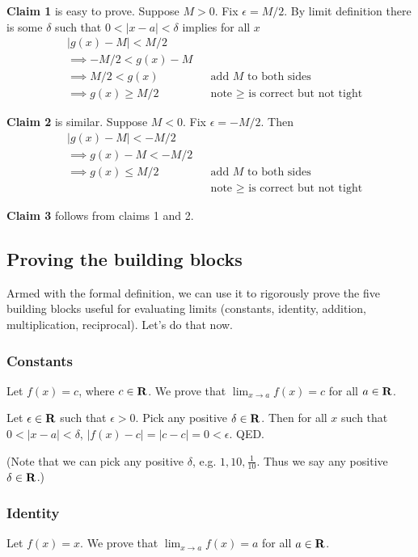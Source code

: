 \textbf{Claim 1} is easy to prove. Suppose $M>0$. Fix $\epsilon=M/2$. By limit definition there is some $\delta$ such that $0<|x-a|<\delta$ implies for all $x$
\begin{align*}
    &|g(x)-M|<M/2\\
    &\implies -M/2<g(x)-M\\
    &\implies M/2<g(x)&&\text{add $M$ to both sides}\\
    &\implies g(x)\geq M/2&&\text{note $\geq$ is correct but not tight}
\end{align*}

\textbf{Claim 2} is similar. Suppose $M<0$. Fix $\epsilon=-M/2$. Then
\begin{align*}
    &|g(x)-M|<-M/2\\
    &\implies g(x)-M<-M/2\\
    &\implies g(x)\leq M/2&&\text{add $M$ to both sides}\\
    & &&\text{note $\geq$ is correct but not tight}
\end{align*}

\textbf{Claim 3} follows from claims 1 and 2.

\subsection{Proving the building blocks}
Armed with the formal definition, we can use it to rigorously prove the five building blocks useful for evaluating limits (constants, identity, addition, multiplication, reciprocal). Let's do that now.

\subsubsection{Constants}
Let $f(x)=c$, where $c\in\mathbf{R}$. We prove that $\lim_{x\to a}f(x)=c$ for all $a\in\mathbf{R}$.

\vs

Let $\epsilon\in\mathbf{R}$ such that $\epsilon>0$. Pick any positive $\delta\in\mathbf{R}$. Then for all $x$ such that $0<|x-a|<\delta$, $|f(x)-c|=|c-c|=0<\epsilon$. QED.

\vs

(Note that we can pick any positive $\delta$, e.g. $1, 10, \frac{1}{10}$. Thus we say any positive $\delta\in\mathbf{R}$.)

\subsubsection{Identity}
Let $f(x)=x$. We prove that $\lim_{x\to a}f(x)=a$ for all $a\in\mathbf{R}$.

